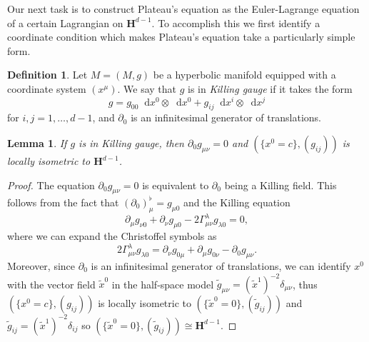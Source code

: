 \documentclass[reqno,12pt,letterpaper]{amsart}
\newcommand{\Hyp}{\mathbf H}
\newcommand*\dif{\mathop{}\!\mathrm{d}}
\newcommand{\dfn}[1]{\emph{#1}\index{#1}}
\newtheorem{lemma}[theorem]{Lemma}
\theoremstyle{definition}
\newtheorem{definition}[theorem]{Definition}
\numberwithin{equation}{section}
\begin{document}

Our next task is to construct Plateau's equation as the Euler-Lagrange equation of a certain Lagrangian on $\Hyp^{d - 1}$.
To accomplish this we first identify a coordinate condition which makes Plateau's equation take a particularly simple form.

\begin{definition}
Let $M = (M, g)$ be a hyperbolic manifold equipped with a coordinate system $(x^\mu)$.
We say that $g$ is in \dfn{Killing gauge} if it takes the form
$$g = g_{00} \dif x^0 \otimes \dif x^0 + g_{ij} \dif x^i \otimes \dif x^j$$
for $i, j = 1, \dots, d - 1$, and $\partial_0$ is an infinitesimal generator of translations.
\end{definition}

\begin{lemma}
If $g$ is in Killing gauge, then $\partial_0 g_{\mu\nu} = 0$ and $(\{x^0 = c\}, (g_{ij}))$ is locally isometric to $\Hyp^{d - 1}$.
\end{lemma}
\begin{proof}
The equation $\partial_0 g_{\mu\nu} = 0$ is equivalent to $\partial_0$ being a Killing field. This follows from the fact that $(\partial_0)^\flat_\mu = g_{\mu 0}$ and the Killing equation
$$\partial_\mu g_{\nu 0} + \partial_\nu g_{\mu 0} - 2\Gamma_{\mu \nu}^\lambda g_{\lambda 0} = 0,$$
where we can expand the Christoffel symbols as
$$2 \Gamma^\lambda_{\mu \nu} g_{\lambda 0} = \partial_\nu g_{0 \mu} + \partial_\mu g_{0 \nu} - \partial_0 g_{\mu \nu}.$$
Moreover, since $\partial_0$ is an infinitesimal generator of translations, we can identify $x^0$ with the vector field $\tilde x^0$ in the half-space model $\tilde g_{\mu\nu} = (\tilde x^1)^{-2} \delta_{\mu\nu}$, thus $(\{x^0 = c\}, (g_{ij}))$ is locally isometric to $(\{\tilde x^0 = 0\}, (\tilde g_{ij}))$ and $\tilde g_{ij} = (\tilde x^1)^{-2} \delta_{ij}$ so $(\{\tilde x^0 = 0\}, (\tilde g_{ij})) \cong \Hyp^{d - 1}$.
\end{proof}
\end{document}
